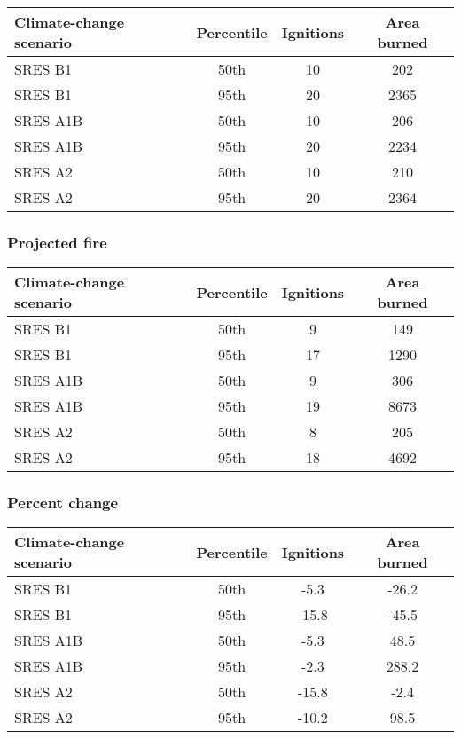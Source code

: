 \documentclass{article}\usepackage[]{graphicx}\usepackage[]{color}
\newcommand{\headcol}{\rowcolor{tableheadcolor}}
\begin{document}
\begin{table}[ht]
\centering
\begin{tabular}{lccc}
  \headcol 
 \toprule
Climate-change scenario & Percentile & Ignitions & Area burned \\ 
  \midrule
SRES B1 & 50th & 10 & 202 \\ 
  SRES B1 & 95th & 20 & 2365 \\ 
  SRES A1B & 50th & 10 & 206 \\ 
  SRES A1B & 95th & 20 & 2234 \\ 
  SRES A2 & 50th & 10 & 210 \\ 
  SRES A2 & 95th & 20 & 2364 \\ 
   \bottomrule
\end{tabular}
\end{table}


\subsubsection{Projected fire}

\begin{table}[ht]
\centering
\begin{tabular}{lccc}
  \headcol 
 \toprule
Climate-change scenario & Percentile & Ignitions & Area burned \\ 
  \midrule
SRES B1 & 50th & 9 & 149 \\ 
  SRES B1 & 95th & 17 & 1290 \\ 
  SRES A1B & 50th & 9 & 306 \\ 
  SRES A1B & 95th & 19 & 8673 \\ 
  SRES A2 & 50th & 8 & 205 \\ 
  SRES A2 & 95th & 18 & 4692 \\ 
   \bottomrule
\end{tabular}
\end{table}


\subsubsection{Percent change}

\begin{table}[ht]
\centering
\begin{tabular}{lccc}
  \headcol 
 \toprule
Climate-change scenario & Percentile & Ignitions & Area burned \\ 
  \midrule
SRES B1 & 50th & -5.3 & -26.2 \\ 
  SRES B1 & 95th & -15.8 & -45.5 \\ 
  SRES A1B & 50th & -5.3 & 48.5 \\ 
  SRES A1B & 95th & -2.3 & 288.2 \\ 
  SRES A2 & 50th & -15.8 & -2.4 \\ 
  SRES A2 & 95th & -10.2 & 98.5 \\ 
   \bottomrule
\end{tabular}
\end{table}
\end{document}
